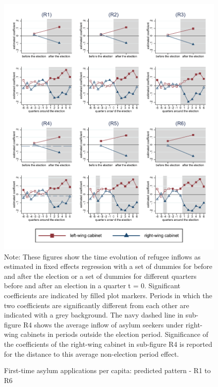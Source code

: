 \documentclass[11pt,a4paper]{scrartcl}
\begin{document}
\clearpage
\FloatBarrier




\clearpage
\FloatBarrier
\begin{figure}[!ht]
	\caption{First-time asylum applications per capita: predicted pattern - R1 to R6}
	\includegraphics[width=1\textwidth]{../results/applications/app_graphs_R1-R6.pdf}
	\scriptsize{Note: These figures show the time evolution of refugee inflows as estimated in fixed effects regression with a set of dummies for before and after the election or a set of dummies for different quarters before and after an election in a quarter t = 0. Significant coefficients are indicated by filled plot markers. Periods in which the two coefficients are significantly different from each other are indicated with a grey background. The navy dashed line in sub-figure R4 shows the average inflow of asylum seekers under right-wing cabinets in periods outside the election period. Significance of the coefficients of the right-wing cabinet in sub-figure R4 is reported for the distance to this average non-election period effect.}
\end{figure}
\end{document}
